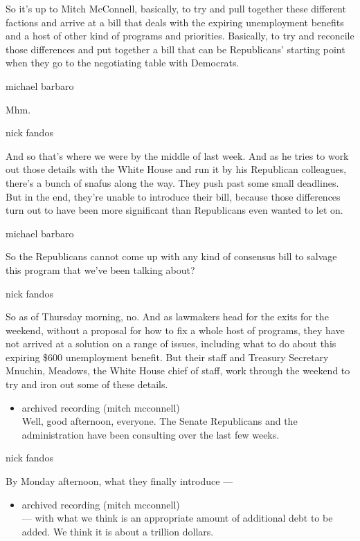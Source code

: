 So it's up to Mitch McConnell, basically, to try and pull together these
different factions and arrive at a bill that deals with the expiring
unemployment benefits and a host of other kind of programs and
priorities. Basically, to try and reconcile those differences and put
together a bill that can be Republicans' starting point when they go to
the negotiating table with Democrats.

michael barbaro

Mhm.

nick fandos

And so that's where we were by the middle of last week. And as he tries
to work out those details with the White House and run it by his
Republican colleagues, there's a bunch of snafus along the way. They
push past some small deadlines. But in the end, they're unable to
introduce their bill, because those differences turn out to have been
more significant than Republicans even wanted to let on.

michael barbaro

So the Republicans cannot come up with any kind of consensus bill to
salvage this program that we've been talking about?

nick fandos

So as of Thursday morning, no. And as lawmakers head for the exits for
the weekend, without a proposal for how to fix a whole host of programs,
they have not arrived at a solution on a range of issues, including what
to do about this expiring \$600 unemployment benefit. But their staff
and Treasury Secretary Mnuchin, Meadows, the White House chief of staff,
work through the weekend to try and iron out some of these details.

\begin{itemize}
\tightlist
\item
  archived recording (mitch mcconnell)\\
  Well, good afternoon, everyone. The Senate Republicans and the
  administration have been consulting over the last few weeks.
\end{itemize}

nick fandos

By Monday afternoon, what they finally introduce ---

\begin{itemize}
\tightlist
\item
  archived recording (mitch mcconnell)\\
  --- with what we think is an appropriate amount of additional debt to
  be added. We think it is about a trillion dollars.
\end{itemize}

